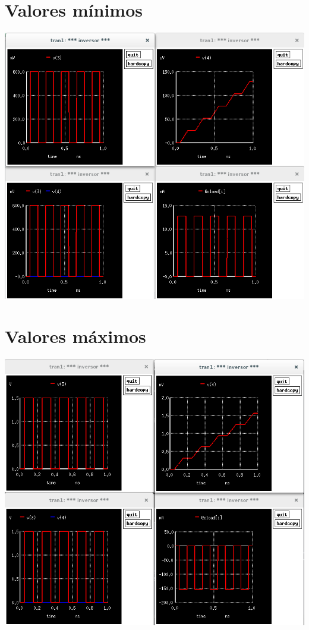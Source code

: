 \documentclass[a4paper, 11pt]{article}
\begin{document}
\section*{Valores mínimos}
\includegraphics[scale=0.420]{min.png}


\section*{Valores máximos}
\includegraphics[scale=0.420]{max.png}
\end{document}
